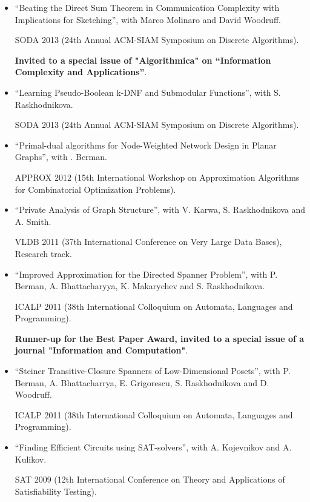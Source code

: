 \documentclass[11pt]{article}
\newenvironment{outerlist}[1][\enskip\textbullet]%
        {\begin{itemize}[#1]}{\end{itemize}%
         \vspace{-.6\baselineskip}}
\begin{document}
\begin{outerlist}
ICDE 2013 (29th IEEE International Conference on Data Engineering). 

\item ``Beating the Direct Sum Theorem in Communication Complexity with Implications for Sketching'', with Marco Molinaro and David Woodruff.

SODA 2013 (24th Annual ACM-SIAM Symposium on Discrete Algorithms).

\textbf{Invited to a special issue of "Algorithmica" on ``Information Complexity and Applications''}. 

\item ``Learning Pseudo-Boolean k-DNF and Submodular Functions'', with S. Raskhodnikova.

SODA 2013 (24th Annual ACM-SIAM Symposium on Discrete Algorithms).


\item ``Primal-dual algorithms for Node-Weighted Network Design in Planar Graphs'', with . Berman.

APPROX 2012 (15th International Workshop on Approximation Algorithms for Combinatorial Optimization Problems).

\item %
``Private Analysis of Graph Structure'',
with V. Karwa, S. Raskhodnikova and A. Smith.

VLDB 2011 (37th International Conference on Very Large Data Bases), Research track.

\item %
``Improved Approximation for the Directed Spanner Problem'', with P. Berman, A. Bhattacharyya, K. Makarychev and S. Raskhodnikova.

ICALP 2011 (38th International Colloquium on Automata, Languages and Programming). 

\textbf{Runner-up for the Best Paper Award, invited to a special issue of a journal "Information and Computation"}.

\item %
``Steiner Transitive-Closure Spanners of Low-Dimensional Posets'',
with P. Berman, A. Bhattacharrya, E. Grigorescu, S. Raskhodnikova and D. Woodruff.

ICALP 2011 (38th International Colloquium on Automata, Languages and Programming).

\item %
``Finding Efficient Circuits using SAT-solvers'', with
A. Kojevnikov and A. Kulikov.

SAT 2009 (12th International Conference on Theory and Applications of Satisfiability Testing).

\end{outerlist}
\end{document}
